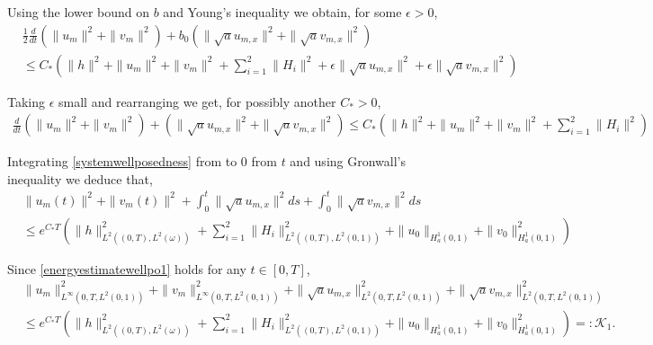 \documentclass[11pt,oneside,a4papper]{osajnl}
\begin{document}
\begin{itemize}
Using the lower bound on $b$ and Young's inequality we obtain, for some $\epsilon>0$, 
\begin{equation*}
	\begin{split}
		&\frac{1}{2}\frac{d}{dt}\left(\|u_{m}\|^{2}+\|v_{m}\|^{2}\right) + b_0 \left(\|\sqrt{a}u_{m,x}\|^{2}+\|\sqrt{a}v_{m,x}\|^{2}\right)\\
		&\leq C_{*}\left(\|h\|^{2}+\|u_{m}\|^{2}+\|v_{m}\|^{2}+\sum_{i=1}^{2}\|H_i\|^{2} + \epsilon \|\sqrt{a} u_{m,x}\|^2 + \epsilon \|\sqrt{a} v_{m,x}\|^2 \right) 
	\end{split}
\end{equation*} 

Taking $\epsilon$ small and rearranging we get, for possibly another $C_*>0$, 
\begin{equation}\label{systemwellposedness}
	\begin{split}
		\frac{d}{dt}\left(\|u_{m}\|^{2}+\|v_{m}\|^{2}\right) + \left(\|\sqrt{a}u_{m,x}\|^{2}+\|\sqrt{a}v_{m,x}\|^{2}\right) \leq C_{*}\left(\|h\|^{2}+\|u_{m}\|^{2}+\|v_{m}\|^{2}+\sum_{i=1}^{2}\|H_i\|^{2} \right) 
	\end{split}
\end{equation} 

Integrating \eqref{systemwellposedness} from  to $0$ from $t$ and using Gronwall's inequality we deduce that, 
\begin{equation}
	\label{energyestimatewellpo1}
	\begin{split}
		&\|u_{m}(t)\|^{2}+\|v_{m}(t)\|^{2} + \int_{0}^{t}\|\sqrt{a}u_{m,x}\|^{2}ds + \int_{0}^{t}\|\sqrt{a}v_{m,x}\|^{2}ds\\ 
		&\leq e^{C_{*} T} \left(\|h\|^{2}_{L^{2}((0,T),L^2(\omega))}+\sum_{i=1}^{2}\|H_i\|^{2}_{L^{2}((0,T),L^2(0,1))} + \|u_{0}\|_{H^{1}_{a}(0,1)} +\|v_0\|^{2}_{H^{1}_a(0,1)}\right)
	\end{split}
\end{equation}

Since \eqref{energyestimatewellpo1} holds for any $t\in[0,T]$, 
\begin{equation}\label{energyestimate1}
	\begin{split}
		&\|u_m\|_{L^{\infty}(0,T,L^{2}(0,1))}^{2}+\|v_{m}\|_{L^{\infty}(0,T,L^{2}(0,1))}^{2}+\|\sqrt{a}u_{m,x}\|_{L^{2}(0,T,L^{2}(0,1))}^{2}+\|\sqrt{a}v_{m,x}\|_{L^{2}(0,T,L^{2}(0,1))}^{2}\\ 
		&\leq e^{C_{*} T} \left(\|h\|^{2}_{L^{2}((0,T),L^2(\omega))}+\sum_{i=1}^{2}\|H_i\|^{2}_{L^{2}((0,T),L^2(0,1))}+\|u_{0}\|_{H^{1}_{a}(0,1)}+\|v_{0}\|^{2}_{H^{1}_a(0,1)}\right) =: \mathcal{K}_1.
	\end{split}
\end{equation}


\end{itemize}
\end{document}
